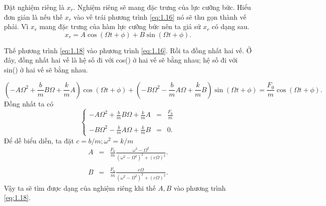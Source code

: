 \documentclass[12pt]{article}
\begin{document}
Đặt nghiệm riêng là \(x_r\). Nghiệm riêng sẽ mang đặc trưng của lực cưỡng bức. Hiểu đơn giản là nếu thế $x_r$ vào vế trái phương trình \ref{eq:1.16} nó sẽ thu gọn thành vế phải. Vì \(x_r\) mang đặc trưng của hàm lực cưỡng bức nên ta giả sử \(x_r\) có dạng sau.
\begin{equation}
    x_r = A \cos{\left(\Omega t + \phi\right)} + B \sin{\left(\Omega t + \phi \right)}.
    \label{eq:1.18}
\end{equation}

Thế phương trình \ref{eq:1.18} vào phương trình \ref{eq:1.16}. Rồi ta đồng nhất hai vế. Ở đây, đồng nhất hai vế là hệ số đi với cos() ở hai vế sẽ bằng nhau; hệ số đi với sin() ở hai vế sẽ bằng nhau.

\begin{equation*}
    \left(-A \Omega^2 + {\displaystyle \frac{b}{m}} B \Omega + {\displaystyle \frac{k}{m}} A  \right) \cos{\left(\Omega t + \phi \right)} + \left(-B \Omega^2 - {\displaystyle \frac{b}{m}} A \Omega + {\displaystyle \frac{k}{m}} B \right) \sin{\left(\Omega t + \phi\right)} = {\displaystyle \frac{F_0}{m}} \cos{\left(\Omega t + \phi \right)}.
\end{equation*}
Đồng nhất ta có
\begin{equation*}
\left\{
    \begin{array}{ccc}
    -A \Omega^2 + {\displaystyle \frac{b}{m}} B \Omega + {\displaystyle \frac{k}{m}} A  &=& {\displaystyle \frac{F_0}{m}} 
    \\
    \\
    -B \Omega^2 - {\displaystyle \frac{b}{m}} A \Omega + {\displaystyle \frac{k}{m}} B  &=& 0.
    \end{array}
\right.         
\end{equation*}
Để dễ biểu diễn, ta đặt \(c = b/m; \omega^2 = k/m\)
\begin{equation}
    \begin{array}{ccc}
    A &=& \displaystyle \frac{F_0}{m} \frac{\omega^2 - \Omega^2}{\left(\omega^2 - \Omega^2 \right)^2 + \left( c \Omega \right)^2}. 
    \\
    \\
    B &=& \displaystyle \frac{F_0}{m} \frac{c \Omega}{\left(\omega^2 - \Omega^2 \right)^2 + \left( c \Omega \right)^2}.
    \end{array}
    \label{eq:1.19}
\end{equation}
Vậy ta sẽ tìm được dạng của nghiệm riêng khi thế \(A, B\) vào phương trình \ref{eq:1.18}. 
\vspace{2mm}
\end{document}
